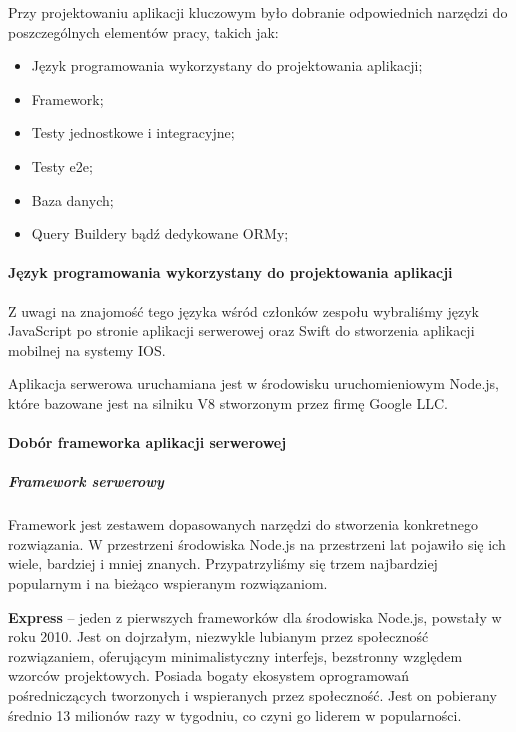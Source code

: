 \documentclass[12pt, a4paper, twoside, openany]{book}
\begin{document}
Przy projektowaniu aplikacji kluczowym było dobranie odpowiednich narzędzi do
poszczególnych elementów pracy, takich jak:
\begin{itemize}
    \item Język programowania wykorzystany do projektowania aplikacji;
    \item Framework;
    \item Testy jednostkowe i integracyjne; %
    \item Testy e2e; %
    \item Baza danych; %
    \item Query Buildery bądź dedykowane ORMy; %
\end{itemize}

\paragraph{Język programowania wykorzystany do projektowania aplikacji\\}

Z uwagi na znajomość tego języka wśród członków zespołu wybraliśmy język JavaScript
po stronie aplikacji serwerowej oraz Swift do stworzenia aplikacji mobilnej na
systemy IOS.

Aplikacja serwerowa uruchamiana jest w środowisku uruchomieniowym Node.js, które bazowane jest na
silniku V8 stworzonym przez firmę Google LLC.

\paragraph{Dobór frameworka aplikacji serwerowej}
\subparagraph{Framework serwerowy\\}

Framework jest zestawem dopasowanych narzędzi do stworzenia konkretnego rozwiązania.
W przestrzeni środowiska Node.js na przestrzeni lat pojawiło się ich wiele, bardziej i
mniej znanych. Przypatrzyliśmy się trzem najbardziej popularnym i na bieżąco wspieranym
rozwiązaniom.

\textbf{Express} -- jeden z pierwszych frameworków dla środowiska Node.js, powstały w roku 2010.
Jest on dojrzałym, niezwykle lubianym przez społeczność rozwiązaniem, oferującym
minimalistyczny interfejs, bezstronny względem wzorców projektowych. Posiada bogaty ekosystem
oprogramowań pośredniczących tworzonych i wspieranych przez społeczność.
Jest on pobierany średnio 13 milionów razy w tygodniu, co czyni go liderem w popularności.
\end{document}
